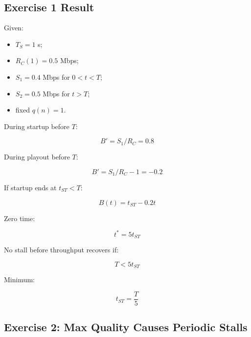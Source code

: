 \begin{center}
\end{center}

\subsection{Exercise 1 Result}

Given:

\begin{itemize}
  \item $T_S=1$ s;
  \item $R_C(1)=0.5$ Mbps;
  \item $S_1=0.4$ Mbps for $0<t<T$;
  \item $S_2=0.5$ Mbps for $t>T$;
  \item fixed $q(n)=1$.
\end{itemize}

During startup before $T$:

\[
B'=S_1/R_C=0.8
\]

During playout before $T$:

\[
B'=S_1/R_C-1=-0.2
\]

If startup ends at $t_{ST}<T$:

\[
B(t)=t_{ST}-0.2t
\]

Zero time:

\[
t^*=5t_{ST}
\]

No stall before throughput recovers if:

\[
T<5t_{ST}
\]

Minimum:

\[
t_{ST}=\frac{T}{5}
\]

\subsection{Exercise 2: Max Quality Causes Periodic Stalls}


